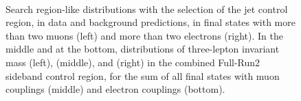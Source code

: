 \begin{figure}[h]
\noindent
  \\
  \caption{Search region-like distributions with the selection of the
    \PQb jet control region, in data and background
    predictions, in final states with more than two muons (left) and
    more than two electrons (right). In the middle and at the bottom, distributions of three-lepton invariant mass (left), \mtwol
    (middle), and \Deltwod (right) in the combined Full-Run2 sideband control region,
    for the sum of all final states with muon couplings (middle) and
    electron couplings (bottom).}
  \label{fig:sb_ttbar_Ctrl}
\end{figure}




